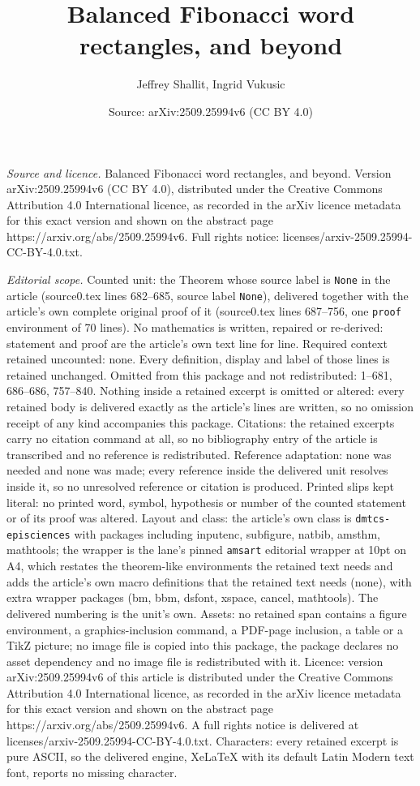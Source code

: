 \documentclass[10pt,a4paper]{amsart}
\title[Balanced Fibonacci word rectangles, and beyond]{Balanced Fibonacci word rectangles, and beyond}
\author{Jeffrey Shallit, Ingrid Vukusic}
\date{Source: arXiv:2509.25994v6 (CC BY 4.0)}
\begin{document}
\maketitle

\noindent\emph{Source and licence.} Balanced Fibonacci word rectangles, and beyond. Version arXiv:2509.25994v6 (CC BY 4.0), distributed under the Creative Commons Attribution 4.0 International licence, as recorded in the arXiv licence metadata for this exact version and shown on the abstract page https://arxiv.org/abs/2509.25994v6. Full rights notice: licenses/arxiv-2509.25994-CC-BY-4.0.txt.\par\smallskip

\noindent\textit{Editorial scope.} Counted unit: the Theorem whose source label is \texttt{None} in the article (source0.tex lines 682--685, source label \texttt{None}), delivered together with the article's own complete original proof of it (source0.tex lines 687--756, one \texttt{proof} environment of 70 lines). No mathematics is written, repaired or re-derived: statement and proof are the article's own text line for line. Required context retained uncounted: none. Every definition, display and label of those lines is retained unchanged. Omitted from this package and not redistributed: 1--681, 686--686, 757--840. Nothing inside a retained excerpt is omitted or altered: every retained body is delivered exactly as the article's lines are written, so no omission receipt of any kind accompanies this package. Citations: the retained excerpts carry no citation command at all, so no bibliography entry of the article is transcribed and no reference is redistributed. Reference adaptation: none was needed and none was made; every reference inside the delivered unit resolves inside it, so no unresolved reference or citation is produced. Printed slips kept literal: no printed word, symbol, hypothesis or number of the counted statement or of its proof was altered. Layout and class: the article's own class is \texttt{dmtcs-episciences} with packages including inputenc, subfigure, natbib, amsthm, mathtools; the wrapper is the lane's pinned \texttt{amsart} editorial wrapper at 10pt on A4, which restates the theorem-like environments the retained text needs and adds the article's own macro definitions that the retained text needs (none), with extra wrapper packages (bm, bbm, dsfont, xspace, cancel, mathtools). The delivered numbering is the unit's own. Assets: no retained span contains a figure environment, a graphics-inclusion command, a PDF-page inclusion, a table or a TikZ picture; no image file is copied into this package, the package declares no asset dependency and no image file is redistributed with it. Licence: version arXiv:2509.25994v6 of this article is distributed under the Creative Commons Attribution 4.0 International licence, as recorded in the arXiv licence metadata for this exact version and shown on the abstract page https://arxiv.org/abs/2509.25994v6. A full rights notice is delivered at licenses/arxiv-2509.25994-CC-BY-4.0.txt. Characters: every retained excerpt is pure ASCII, so the delivered engine, XeLaTeX with its default Latin Modern text font, reports no missing character.
\end{document}
